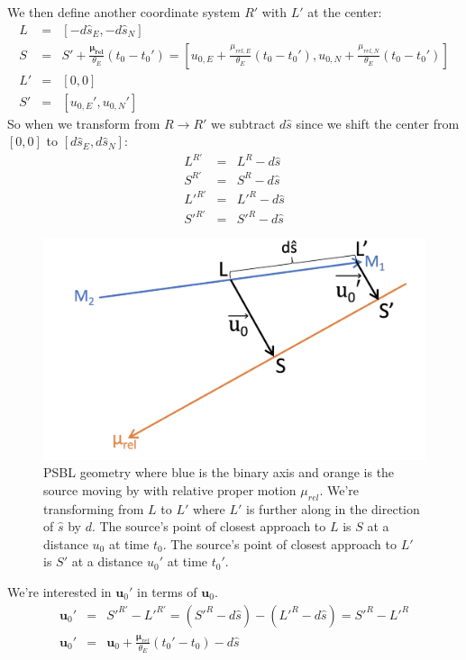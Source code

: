\documentclass[twocolumn]{aastex701}
\newcommand{\vect}[1]{\boldsymbol{#1}}
\begin{document}
We then define another coordinate system $R'$ with $L'$ at the center:
\begin{eqnarray}
   L &=& [-d\hat{s}_E, -d\hat{s}_N] \\
    S &=& S' + \frac{\vect{\mu_{rel}}}{\theta_E}(t_0 - t_0') = [u_{0, E} + \frac{\mu_{rel, E}}{\theta_E}(t_0 - t_0'), u_{0, N} + \frac{\mu_{rel, N}}{\theta_E}(t_0 - t_0')] \\
    L' &=&  [0, 0] \\
    S' &=& [u_{0, E}', u_{0, N}'] 
\end{eqnarray}
So when we transform from $R \rightarrow R'$ we subtract $d\hat{s}$ since we shift the center from $[0, 0]$ to $[d\hat{s}_E, d\hat{s}_N]$:
\begin{eqnarray}
    L^{R'} &=& L^R - d\hat{s} \\
    S^{R'} &=& S^R - d\hat{s} \\
    L'^{R'} &=& L'^R - d\hat{s} \\
    S'^{R'} &=& S'^R - d\hat{s}
\end{eqnarray}
\begin{figure}[h]
    \centering
    \includegraphics[scale=0.3]{figures/psbl_coord_transform.png}
    \caption{PSBL geometry where blue is the binary axis and orange is the source moving by with relative proper motion $\mu_{rel}$. We're transforming from $L$ to $L'$ where $L'$ is further along in the direction of $\hat{s}$ by $d$. The source's point of closest approach to $L$ is $S$ at a distance $u_0$ at time $t_0$. The source's point of closest approach to $L'$ is $S'$ at a distance $u_0'$ at time $t_0'$.}
    \label{fig:psbl coord transform}
\end{figure}
We're interested in $\vect{u}_0'$ in terms of $\vect{u}_0$.
\begin{eqnarray}
    \vect{u}_0' &=& S'^{R'} - L'^{R'} = (S'^R - d\hat{s}) - (L'^R - d\hat{s}) = S'^R - L'^R \\
    \label{eq: u0' vectors}
    \vect{u}_0' &=& \vect{u}_0 + \frac{\vect{\mu}_{rel}}{\theta_E}(t_0' - t_0) - d\hat{s}
\end{eqnarray}
\end{document}
